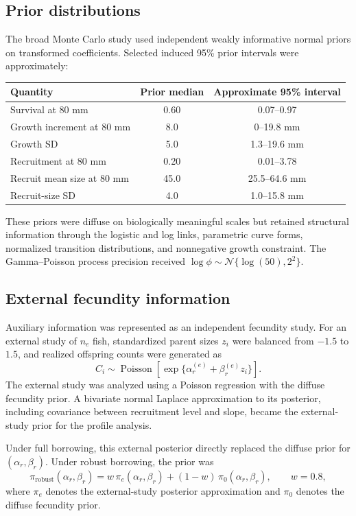 \documentclass[11pt]{article}
\newcommand{\Normal}{\mathcal{N}}
\begin{document}
\subsection{Prior distributions}

The broad Monte Carlo study used independent weakly informative normal priors
on transformed coefficients. Selected induced 95\% prior intervals were
approximately:
\begin{center}
\begin{tabular}{lcc}
\toprule
Quantity & Prior median & Approximate 95\% interval\\
\midrule
Survival at 80 mm & 0.60 & 0.07--0.97\\
Growth increment at 80 mm & 8.0 & 0--19.8 mm\\
Growth SD & 5.0 & 1.3--19.6 mm\\
Recruitment at 80 mm & 0.20 & 0.01--3.78\\
Recruit mean size at 80 mm & 45.0 & 25.5--64.6 mm\\
Recruit-size SD & 4.0 & 1.0--15.8 mm\\
\bottomrule
\end{tabular}
\end{center}
These priors were diffuse on biologically meaningful scales but retained
structural information through the logistic and log links, parametric curve
forms, normalized transition distributions, and nonnegative growth
constraint. The Gamma--Poisson process precision received
\(\log\phi\sim\Normal\{\log(50),2^2\}\).

\subsection{External fecundity information}

Auxiliary information was represented as an independent fecundity study. For
an external study of \(n_e\) fish, standardized parent sizes \(z_i\) were
balanced from \(-1.5\) to \(1.5\), and realized offspring counts were
generated as
\begin{equation}
  C_i\sim\operatorname{Poisson}
  \left[\exp\{\alpha_r^{(e)}+\beta_r^{(e)}z_i\}\right].
\end{equation}
The external study was analyzed using a Poisson regression with the diffuse
fecundity prior. A bivariate normal Laplace approximation to its posterior,
including covariance between recruitment level and slope, became the
external-study prior for the profile analysis.

Under full borrowing, this external posterior directly replaced the diffuse
prior for \((\alpha_r,\beta_r)\). Under robust borrowing, the prior was
\begin{equation}
  \pi_{\mathrm{robust}}(\alpha_r,\beta_r)
  =
  w\,\pi_e(\alpha_r,\beta_r)
  +(1-w)\,\pi_0(\alpha_r,\beta_r),
  \qquad w=0.8,
\end{equation}
where \(\pi_e\) denotes the external-study posterior approximation and
\(\pi_0\) denotes the diffuse fecundity prior.
\end{document}
